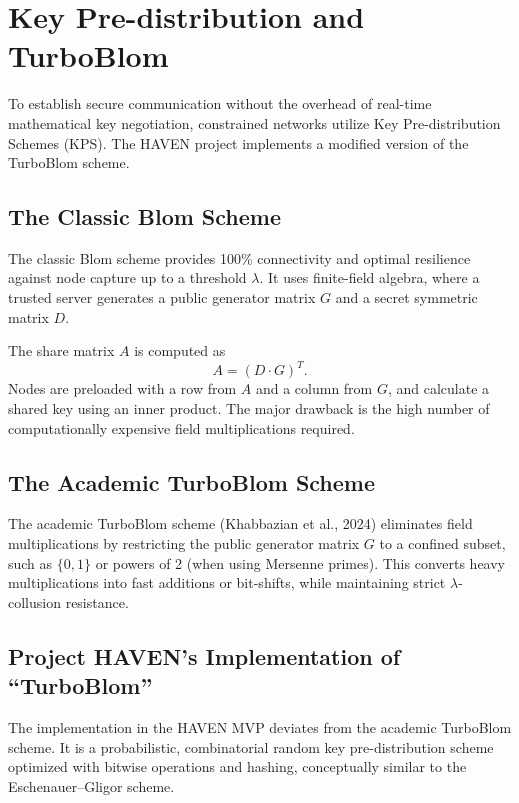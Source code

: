 \documentclass[11pt,a4paper]{article}
\newcommand{\citeref}[1]{}
\begin{document}
\section{Key Pre-distribution and TurboBlom}

To establish secure communication without the overhead of real-time mathematical key negotiation, constrained networks utilize Key Pre-distribution Schemes (KPS).\citeref{4} The HAVEN project implements a modified version of the TurboBlom scheme.

\subsection{The Classic Blom Scheme}

The classic Blom scheme provides 100\% connectivity and optimal resilience against node capture up to a threshold $\lambda$.\citeref{4} It uses finite-field algebra, where a trusted server generates a public generator matrix $G$ and a secret symmetric matrix $D$.\citeref{4}

The share matrix $A$ is computed as
\begin{equation*}
A = (D \cdot G)^{T}.
\end{equation*}
\citeref{4} Nodes are preloaded with a row from $A$ and a column from $G$, and calculate a shared key using an inner product.\citeref{4} The major drawback is the high number of computationally expensive field multiplications required.\citeref{4}

\subsection{The Academic TurboBlom Scheme}

The academic TurboBlom scheme (Khabbazian et al., 2024) eliminates field multiplications by restricting the public generator matrix $G$ to a confined subset, such as $\{0,1\}$ or powers of 2 (when using Mersenne primes).\citeref{4} This converts heavy multiplications into fast additions or bit-shifts, while maintaining strict $\lambda$-collusion resistance.\citeref{4}

\subsection{Project HAVEN's Implementation of ``TurboBlom''}

The implementation in the HAVEN MVP deviates from the academic TurboBlom scheme. It is a probabilistic, combinatorial random key pre-distribution scheme optimized with bitwise operations and hashing, conceptually similar to the Eschenauer--Gligor scheme.\citeref{4}
\end{document}
